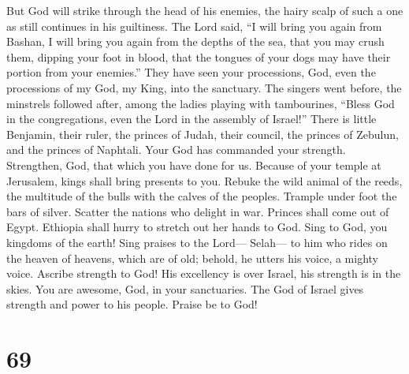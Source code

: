  But God will strike through the head of his enemies, the
hairy scalp of such a one as still continues in his guiltiness.
 The Lord said, ``I will bring you again from Bashan, I
will bring you again from the depths of the sea,  that
you may crush them, dipping your foot in blood, that the tongues of your
dogs may have their portion from your enemies.''  They
have seen your processions, God, even the processions of my God, my
King, into the sanctuary.  The singers went before, the
minstrels followed after, among the ladies playing with tambourines,
 ``Bless God in the congregations, even the Lord in the
assembly of Israel!''  There is little Benjamin, their
ruler, the princes of Judah, their council, the princes of Zebulun, and
the princes of Naphtali.  Your God has commanded your
strength. Strengthen, God, that which you have done for us.
 Because of your temple at Jerusalem, kings shall bring
presents to you.  Rebuke the wild animal of the reeds,
the multitude of the bulls with the calves of the peoples. Trample under
foot the bars of silver. Scatter the nations who delight in war.
 Princes shall come out of Egypt. Ethiopia shall hurry to
stretch out her hands to God.  Sing to God, you kingdoms
of the earth! Sing praises to the Lord--- Selah---  to
him who rides on the heaven of heavens, which are of old; behold, he
utters his voice, a mighty voice.  Ascribe strength to
God! His excellency is over Israel, his strength is in the skies.
 You are awesome, God, in your sanctuaries. The God of
Israel gives strength and power to his people. Praise be to God!

\hypertarget{section-68}{%
\section{69}\label{section-68}}

